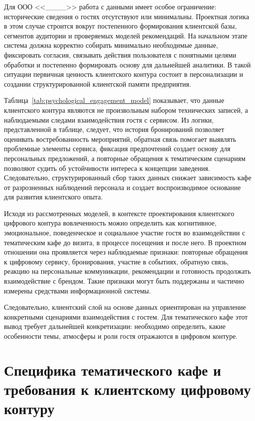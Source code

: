Для ООО <<\_\_\_\_>> работа с данными имеет особое ограничение: исторические сведения о гостях отсутствуют или минимальны. Проектная логика в этом случае строится вокруг постепенного формирования клиентской базы, сегментов аудитории и проверяемых моделей рекомендаций. На начальном этапе система должна корректно собирать минимально необходимые данные, фиксировать согласия, связывать действия пользователя с понятными целями обработки и постепенно формировать основу для дальнейшей аналитики. В такой ситуации первичная ценность клиентского контура состоит в персонализации и создании структурированной клиентской памяти предприятия.

Таблица~\ref{tab:psychological_engagement_model} показывает, что данные клиентского контура являются не произвольным набором технических записей, а наблюдаемыми следами взаимодействия гостя с сервисом. Из логики, представленной в таблице, следует, что история бронирований позволяет оценивать востребованность мероприятий, обратная связь помогает выявлять проблемные элементы сервиса, фиксация предпочтений создает основу для персональных предложений, а повторные обращения к тематическим сценариям позволяют судить об устойчивости интереса к концепции заведения. Следовательно, структурированный сбор таких данных снижает зависимость кафе от разрозненных наблюдений персонала и создает воспроизводимое основание для развития клиентского опыта.

Исходя из рассмотренных моделей, в контексте проектирования клиентского цифрового контура вовлеченность можно определить как когнитивное, эмоциональное, поведенческое и социальное участие гостя во взаимодействии с тематическим кафе до визита, в процессе посещения и после него. В проектном отношении она проявляется через наблюдаемые признаки: повторные обращения к цифровому сервису, бронирования, участие в событиях, обратную связь, реакцию на персональные коммуникации, рекомендации и готовность продолжать взаимодействие с брендом. Такие признаки могут быть поддержаны и частично измерены средствами информационной системы.

Следовательно, клиентский слой на основе данных ориентирован на управление конкретными сценариями взаимодействия с гостем. Для тематического кафе этот вывод требует дальнейшей конкретизации: необходимо определить, какие особенности темы, атмосферы и роли гостя отражаются в цифровом контуре.

\section{Специфика тематического кафе и требования к клиентскому цифровому контуру}

